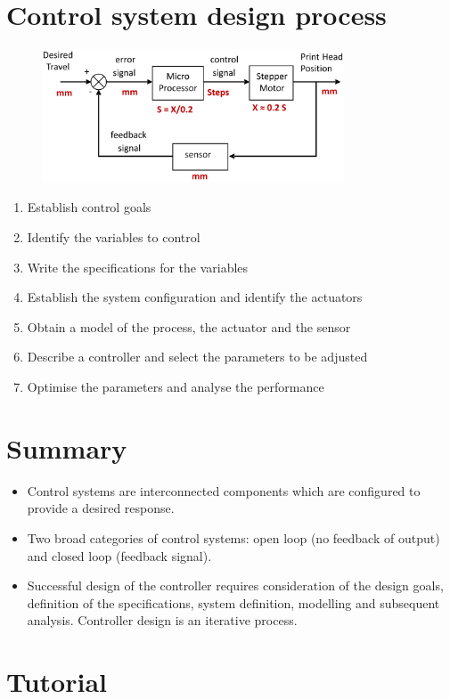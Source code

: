 \documentclass[class=report, crop=false, 12pt,a4paper]{standalone}
\begin{document}
\section{Control system design process}
\begin{figure}
  \centering
  \includegraphics[width = 0.8\textwidth]{../img/controlstrat3dprinterclosed.PNG}
\end{figure}
\begin{enumerate}
  \item Establish control goals
  \item Identify the variables to control
  \item Write the specifications for the variables
  \item Establish the system configuration and identify the actuators
  \item Obtain a model of the process, the actuator and the sensor
  \item Describe a controller and select the parameters to be adjusted
  \item Optimise the parameters and analyse the performance
\end{enumerate}
\section{Summary}
\begin{itemize}
  \item Control systems are interconnected components which are configured to provide a desired response.
  \item Two broad categories of control systems: open loop (no feedback of output) and closed loop (feedback signal).
  \item Successful design of the controller requires consideration of the design goals, definition of the specifications, system definition, modelling and subsequent analysis. Controller design is an iterative process.
\end{itemize}
\section{Tutorial}
\end{document}
